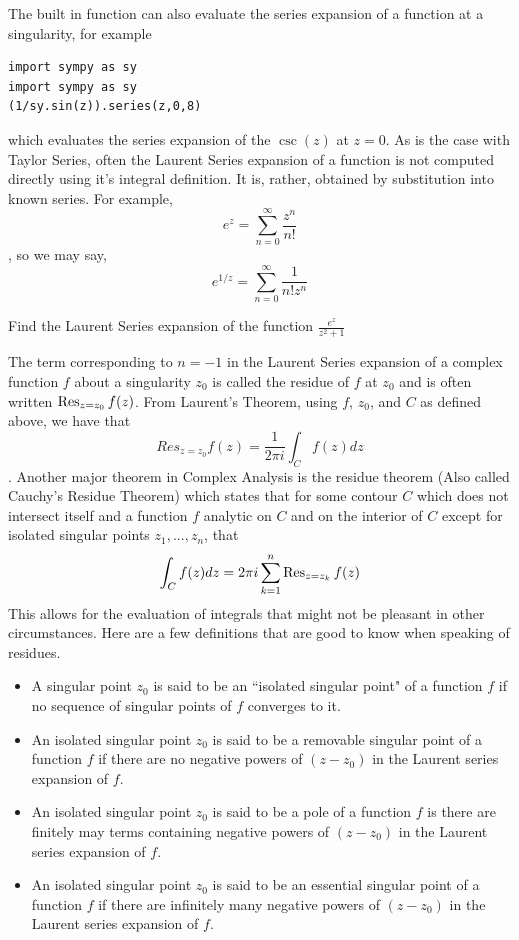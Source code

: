 The built in function  can also evaluate the series expansion of a function at a singularity, for example
\begin{lstlisting}
import sympy as sy
import sympy as sy
(1/sy.sin(z)).series(z,0,8)
\end{lstlisting}
which evaluates the series expansion of the $\csc(z)$ at $z=0$. 
As is the case with Taylor Series, often the Laurent Series expansion of a function is not computed directly using it's integral definition.
It is, rather, obtained by substitution into known series.
For example, 
$$e^z = \sum_{n=0}^{\infty} \frac{z^n}{n!}$$, so we may say,
$$e^{1/z} = \sum_{n=0}^{\infty} \frac{1}{n! z^n}$$

\begin{problem}
Find the Laurent Series expansion of the function $\frac{e^{z}}{z^2 +1}$
\end{problem}


The term corresponding to $n=-1$ in the Laurent Series expansion of a complex function $f$ about a singularity $z_0$ is called the residue of $f$ at $z_0$ and is often written $\operatorname{Res}_{z=z_0} f(z)$.
From Laurent's Theorem, using $f$, $z_0$, and $C$ as defined above, we have that $$Res_{z=z_0} f(z) = \frac{1}{2 \pi i} \int_C f(z) dz$$.
Another major theorem in Complex Analysis is the residue theorem (Also called Cauchy's Residue Theorem) which states that for some contour $C$ which does not intersect itself and a function $f$ analytic on $C$ and on the interior of $C$ except for isolated singular points $z_1,...,z_n$, that 
$$\int_C f(z) dz = 2 \pi i \sum_{k=1}^{n} \operatorname{Res}_{z=z_k} f(z)$$
This allows for the evaluation of integrals that might not be pleasant in other circumstances.
Here are a few definitions that are good to know when speaking of residues.
\begin{itemize}
\item A singular point $z_0$ is said to be an ``isolated singular point" of a function $f$ if no sequence of singular points of $f$ converges to it.
\item An isolated singular point $z_0$ is said to be a removable singular point of a function $f$ if there are no negative powers of $(z-z_0)$ in the Laurent series expansion of $f$.
\item An isolated singular point $z_0$ is said to be a pole of a function $f$ is there are finitely may terms containing negative powers of $(z-z_0)$ in the Laurent series expansion of $f$. 
\item An isolated singular point $z_0$ is said to be an essential singular point of a function $f$ if there are infinitely many negative powers of $(z-z_0)$ in the Laurent series expansion of $f$.
\end{itemize}

